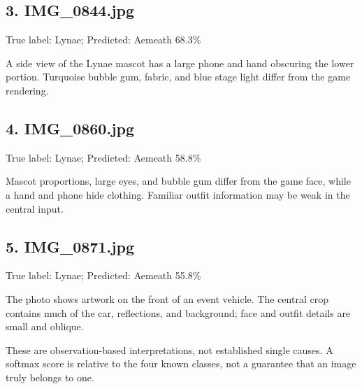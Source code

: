 \documentclass[11pt]{article}
\begin{document}
\par\noindent\begin{minipage}{\linewidth}
\subsection*{3. IMG\_0844.jpg}
True label: Lynae; Predicted: Aemeath 68.3\%
\begin{center}\par\noindent {}\par\end{center}
A side view of the Lynae mascot has a large phone and hand obscuring the lower portion. Turquoise bubble gum, fabric, and blue stage light differ from the game rendering.
\end{minipage}\par\medskip

\par\noindent\begin{minipage}{\linewidth}
\subsection*{4. IMG\_0860.jpg}
True label: Lynae; Predicted: Aemeath 58.8\%
\begin{center}\par\noindent {}\par\end{center}
Mascot proportions, large eyes, and bubble gum differ from the game face, while a hand and phone hide clothing. Familiar outfit information may be weak in the central input.
\end{minipage}\par\medskip

\par\noindent\begin{minipage}{\linewidth}
\subsection*{5. IMG\_0871.jpg}
True label: Lynae; Predicted: Aemeath 55.8\%
\begin{center}\par\noindent {}\par\end{center}
The photo shows artwork on the front of an event vehicle. The central crop contains much of the car, reflections, and background; face and outfit details are small and oblique.
\end{minipage}\par\medskip
These are observation-based interpretations, not established single causes. A softmax score is relative to the four known classes, not a guarantee that an image truly belongs to one.
\end{document}
